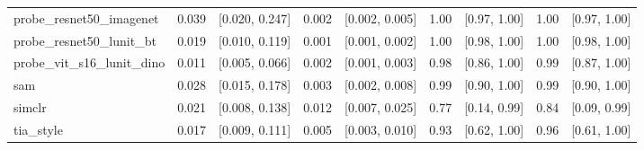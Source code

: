 \begin{tabular}{lrrrrrrrr}
probe\_resnet50\_imagenet & 0.039 & [0.020, 0.247] & 0.002 & [0.002, 0.005] & 1.00 & [0.97, 1.00] & 1.00 & [0.97, 1.00] \\
probe\_resnet50\_lunit\_bt & 0.019 & [0.010, 0.119] & 0.001 & [0.001, 0.002] & 1.00 & [0.98, 1.00] & 1.00 & [0.98, 1.00] \\
probe\_vit\_s16\_lunit\_dino & 0.011 & [0.005, 0.066] & 0.002 & [0.001, 0.003] & 0.98 & [0.86, 1.00] & 0.99 & [0.87, 1.00] \\
sam & 0.028 & [0.015, 0.178] & 0.003 & [0.002, 0.008] & 0.99 & [0.90, 1.00] & 0.99 & [0.90, 1.00] \\
simclr & 0.021 & [0.008, 0.138] & 0.012 & [0.007, 0.025] & 0.77 & [0.14, 0.99] & 0.84 & [0.09, 0.99] \\
tia\_style & 0.017 & [0.009, 0.111] & 0.005 & [0.003, 0.010] & 0.93 & [0.62, 1.00] & 0.96 & [0.61, 1.00] \\
\bottomrule
\end{tabular}
